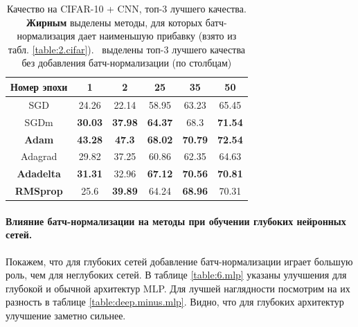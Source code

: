 \documentclass[12pt]{article}
\begin{document}
\begin{table}[h!]
\centering
\begin{tabular}{|c|c|c|c|c|c|}\hline
\textbf{Номер эпохи} & \textbf{1} & \textbf{2} & \textbf{25} & \textbf{35} & \textbf{50} \\\hline 
{SGD} & 24.26 & 22.14 & 58.95 & 63.23 & 65.45 \\\hline

{SGDm} & \color{green}\textbf{30.03} & \color{green}\textbf{37.98} & \color{green}\textbf{64.37} & 68.3 & \color{green}\textbf{71.54} \\\hline 

\textbf{Adam} & \color{green}\textbf{43.28} &\color{green}\textbf{47.3} & \color{green}\textbf{68.02} & \color{green}\textbf{70.79} & \color{green}\textbf{72.54} \\\hline

{Adagrad} & 29.82 & 37.25 & 60.86 & 62.35 & 64.63 \\\hline

\textbf{Adadelta} & \color{green}\textbf{31.31} & 32.96 & \color{green}\textbf{67.12} & \color{green}\textbf{70.56} & \color{green}\textbf{70.81} \\\hline

\textbf{RMSprop} & 25.6 & \color{green}\textbf{39.89} & 64.24 & \color{green}\textbf{68.96} & 70.31 \\\hline

\end{tabular}
\caption{\small Качество на CIFAR-10 + CNN, топ-3 лучшего качества. \textbf{Жирным} выделены методы, для которых батч-нормализация дает наименьшую прибавку (взято из табл. \ref{table:2.cifar}). \color{black} \ выделены топ-3 лучшего качества без добавления батч-нормализации (по столбцам)} \label{table:5}
\end{table}

\newpage
\paragraph{Влияние батч-нормализации на методы при обучении глубоких нейронных сетей.\\}

Покажем, что для глубоких сетей добавление батч-нормализации играет большую роль, чем для неглубоких сетей. В таблице \ref{table:6.mlp} указаны улучшения для глубокой и обычной архитектур MLP. Для лучшей наглядности посмотрим на их разность в таблице \ref{table:deep.minus.mlp}. Видно, что для глубоких архитектур улучшение заметно сильнее. %
\end{document}

